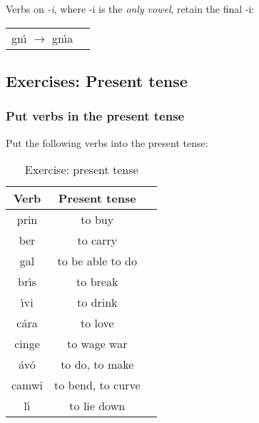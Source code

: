 Verbs on \textit{-i}, where -i is the \textit{only vowel}, retain the final -i:
\begin{table}[H]
\begin{tabular}{ll}
  gn\'{\i} $\rightarrow$ gn\'{\i}a
\end{tabular}
\label{example_verbs_on_i_only_vowel}
\end{table}

\newpage
\subsection{Exercises: Present tense}
\subsubsection{Put verbs in the present tense}
Put the following verbs into the present tense:
\begin{table}[H]
\centering
\begin{tabular}{|c|c|M{10.0cm}|}
  \toprule
  \textbf{Verb} & \textbf{Present tense}\\
  \toprule
  prin & to buy & \\
  \midrule
  ber & to carry & \\
  \midrule
  gal & to be able to do & \\
  \midrule
  br\'{\i}s & to break & \\
  \midrule
  \'{\i}vi & to drink & \\
  \midrule
  c\'{a}ra & to love & \\
  \midrule
  cinge & to wage war & \\
  \midrule
  \'{a}v\'{o} & to do, to make & \\
  \midrule
  camwi & to bend, to curve & \\
  \midrule
  l\'{\i} & to lie down & \\
  \bottomrule
\end{tabular}
\caption{Exercise: present tense}
\label{exercise_present_tense}
\end{table}

\newpage
